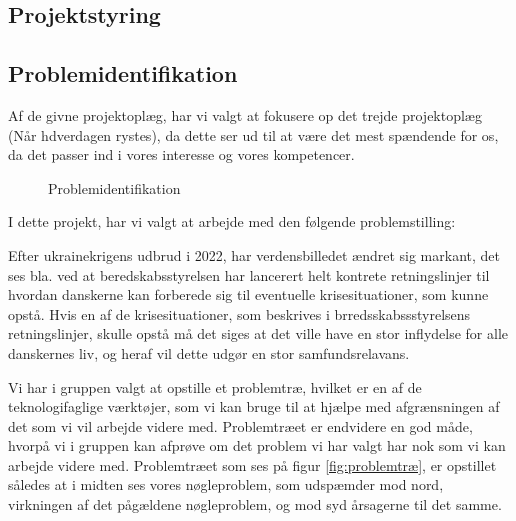 \subsection{Projektstyring}


\subsection{Problemidentifikation}
Af de givne projektoplæg, har vi valgt at fokusere op det trejde projektoplæg (Når hdverdagen rystes), da dette ser ud til at være det mest spændende for os, da det passer ind i vores interesse og vores kompetencer.

\begin{figure}[H]
    \centering
    \caption{Problemidentifikation}
\end{figure}


I dette projekt, har vi valgt at arbejde med den følgende problemstilling:

Efter ukrainekrigens udbrud i 2022, har verdensbilledet ændret sig markant, det ses bla. ved at beredskabsstyrelsen har lancerert helt kontrete retningslinjer til hvordan danskerne kan forberede sig til eventuelle krisesituationer, som kunne opstå. Hvis en af de krisesituationer, som beskrives i brredsskabssstyrelsens retningslinjer, skulle opstå må det siges at det ville have en stor inflydelse for alle danskernes liv, og heraf vil dette udgør en stor samfundsrelavans.

Vi har i gruppen valgt at opstille et problemtræ, hvilket er en af de teknologifaglige værktøjer, 
som vi kan bruge til at hjælpe med afgrænsningen af det som vi vil arbejde videre med. Problemtræet er endvidere en god måde, hvorpå vi i gruppen kan afprøve om det problem vi har valgt har nok som vi kan arbejde videre med. Problemtræet som ses på figur \ref{fig:problemtræ}, er opstillet således at i midten ses vores nøgleproblem, som udspæmder mod nord, virkningen af det pågældene nøgleproblem, og mod syd årsagerne til det samme.

